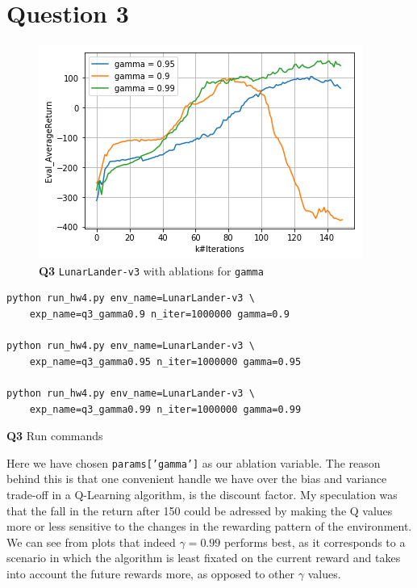 \documentclass[11pt]{article}
\begin{document}
\section{Question 3}
\label{sec:org834ab6d}
\begin{figure}[htbp]
\centering
\includegraphics[width=.9\linewidth]{./3.png}
\caption{\textbf{Q3} \texttt{LunarLander-v3} with ablations for \texttt{gamma}}
\end{figure}

\begin{listing}[htbp]
\begin{verbatim}
python run_hw4.py env_name=LunarLander-v3 \
    exp_name=q3_gamma0.9 n_iter=1000000 gamma=0.9

python run_hw4.py env_name=LunarLander-v3 \
    exp_name=q3_gamma0.95 n_iter=1000000 gamma=0.95

python run_hw4.py env_name=LunarLander-v3 \
    exp_name=q3_gamma0.99 n_iter=1000000 gamma=0.99
\end{verbatim}
\caption{\textbf{Q3} Run commands}
\end{listing}

Here we have chosen \texttt{params['gamma']} as our ablation variable. The reason behind this is that one convenient handle we have over the bias and variance trade-off in a Q-Learning algorithm, is the discount factor. My speculation was that the fall in the return after 150 could be adressed by making the Q values more or less sensitive to the changes in the rewarding pattern of the environment. We can see from plots that indeed \(\gamma=0.99\) performs best, as it corresponds to a scenario in which the algorithm is least fixated on the current reward and takes into account the future rewards more, as opposed to other \(\gamma\) values.
\end{document}
